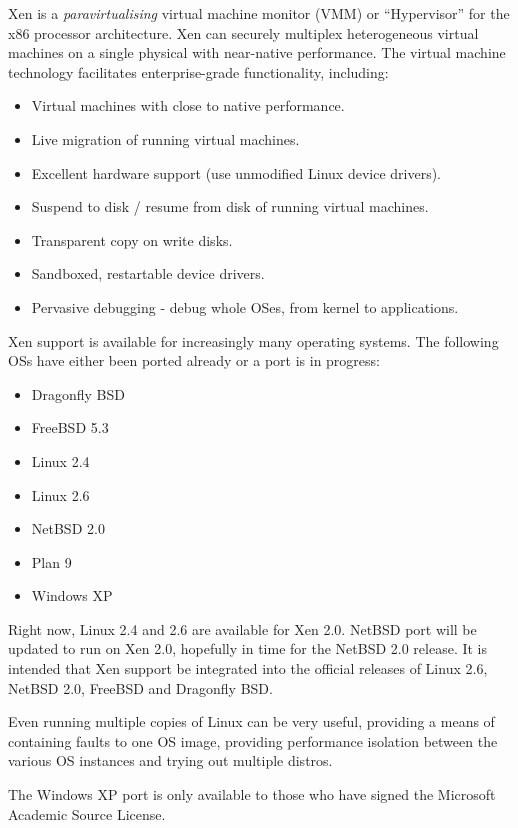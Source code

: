 \documentclass[11pt,twoside,final,openright]{xenstyle}
\begin{document}
Xen is a { \em paravirtualising } virtual machine monitor (VMM) or
``Hypervisor'' for the x86 processor architecture.  Xen can securely
multiplex heterogeneous virtual machines on a single physical with
near-native performance.  The virtual machine technology facilitates
enterprise-grade functionality, including:

\begin{itemize}
\item Virtual machines with close to native performance.
\item Live migration of running virtual machines.
\item Excellent hardware support (use unmodified Linux device drivers).
\item Suspend to disk / resume from disk of running virtual machines.
\item Transparent copy on write disks.
\item Sandboxed, restartable device drivers.
\item Pervasive debugging - debug whole OSes, from kernel to applications.
\end{itemize}

Xen support is available for increasingly many operating systems.  The
following OSs have either been ported already or a port is in
progress:
\begin{itemize}
\item Dragonfly BSD
\item FreeBSD 5.3
\item Linux 2.4
\item Linux 2.6
\item NetBSD 2.0
\item Plan 9
\item Windows XP
\end{itemize}

Right now, Linux 2.4 and 2.6 are available for Xen 2.0.  NetBSD
port will be updated to run on Xen 2.0, hopefully in time for the NetBSD
2.0 release.  It is intended that Xen support be integrated into the
official releases of Linux 2.6, NetBSD 2.0, FreeBSD and Dragonfly BSD.

Even running multiple copies of Linux can be very useful, providing a
means of containing faults to one OS image, providing performance
isolation between the various OS instances and trying out multiple
distros.

The Windows XP port is only available to those who have signed the
Microsoft Academic Source License.
\end{document}
